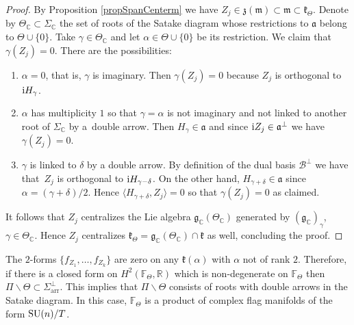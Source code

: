 \documentclass[pdftex]{sigma}
\numberwithin{equation}{section}
\begin{document}
\begin{proof}By Proposition \ref{propSpanCenterm} we have $Z_{j}\in \mathfrak{z} ( \mathfrak{m}) \subset \mathfrak{m}\subset \mathfrak{k}_{\Theta }$. Denote by $\Theta _{\mathbb{C}}\subset \Sigma _{\mathbb{C}}$ the set of
roots of the Satake diagram whose restrictions to $\mathfrak{a}$ belong to $\Theta \cup \{0\}$. Take $\gamma \in \Theta _{\mathbb{C}}$ and let $\alpha \in \Theta \cup \{0\}$ be its restriction. We claim that $\gamma (Z_{j}) =0$. There are the possibilities:
\begin{enumerate}\itemsep=0pt
\item $\alpha =0$, that is, $\gamma $ is imaginary. Then $\gamma ( Z_{j}) =0$ because $Z_{j}$ is orthogonal to ${\rm i}H_{\gamma }$.

\item $\alpha $ has multiplicity $1$ so that $\gamma =\alpha $ is not imaginary and not linked to another root of $\Sigma _{\mathbb{C}}$ by a~double arrow. Then $H_{\gamma }\in \mathfrak{a}$ and since ${\rm i}Z_{j}\in
\mathfrak{a}^{\bot }$ we have $\gamma ( Z_{j}) =0$.

\item $\gamma $ is linked to $\delta $ by a double arrow. By definition of the dual basis $\mathcal{B}^{\bot}$ we have that~$Z_{j}$ is orthogonal to ${\rm i}H_{\gamma -\delta }$. On the other hand, $H_{\gamma +\delta }\in \mathfrak{a}$ since $\alpha = ( \gamma +\delta ) /2$. Hence $\langle H_{\gamma +\delta },Z_{j}\rangle =0$ so that $\gamma ( Z_{j}) =0$ as claimed.
\end{enumerate}

It follows that $Z_{j}$ centralizes the Lie algebra $\mathfrak{g}_{\mathbb{C}} ( \Theta _{\mathbb{C}} ) $ generated by $ ( \mathfrak{g}_{\mathbb{C}} ) _{\gamma }$, $\gamma \in \Theta _{\mathbb{C}}$. Hence $Z_{j}$ centralizes $\mathfrak{k}_{\Theta }=\mathfrak{g}_{\mathbb{C}} (\Theta _{\mathbb{C}}) \cap \mathfrak{k}$ as well, concluding the proof.
\end{proof}

The $2$-forms $\{f_{Z_{1}},\ldots,f_{Z_{k}}\}$ are zero on any $\mathfrak{k}(\alpha )$ with $\alpha $ not of rank $2$. Therefore, if there is a closed form on $H^{2}(\mathbb{F}_{\Theta },\mathbb{R})$ which is non-degenerate on $\mathbb{F}_{\Theta }$ then $\Pi \backslash \Theta \subset \Sigma _{\mathrm{arr}}^{\bot }$. This implies that $\Pi \backslash \Theta $ consists of roots with double arrows in the Satake diagram. In this case, $\mathbb{F}_{\Theta } $ is a product of complex flag manifolds of the form ${\rm SU}(n)/T$.
\end{document}

